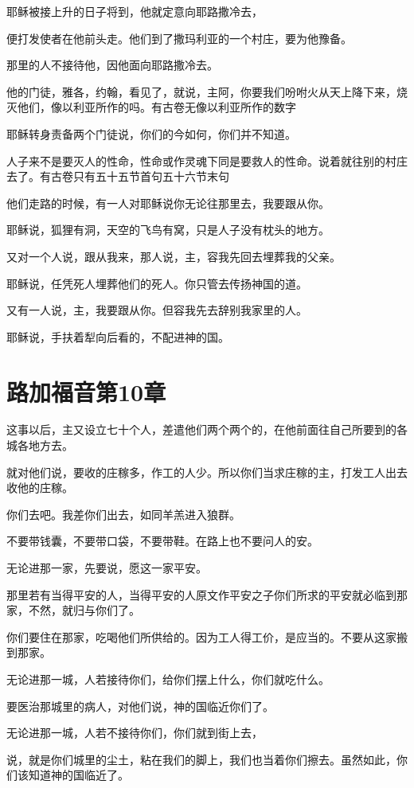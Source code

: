 \documentclass[12pt,oneside]{book}
\begin{document}
耶稣被接上升的日子将到，他就定意向耶路撒冷去，

便打发使者在他前头走。他们到了撒玛利亚的一个村庄，要为他豫备。

那里的人不接待他，因他面向耶路撒冷去。

他的门徒，雅各，约翰，看见了，就说，主阿，你要我们吩咐火从天上降下来，烧灭他们，像以利亚所作的吗。有古卷无像以利亚所作的数字

耶稣转身责备两个门徒说，你们的今如何，你们并不知道。

人子来不是要灭人的性命，性命或作灵魂下同是要救人的性命。说着就往别的村庄去了。有古卷只有五十五节首句五十六节末句

他们走路的时候，有一人对耶稣说你无论往那里去，我要跟从你。

耶稣说，狐狸有洞，天空的飞鸟有窝，只是人子没有枕头的地方。

又对一个人说，跟从我来，那人说，主，容我先回去埋葬我的父亲。

耶稣说，任凭死人埋葬他们的死人。你只管去传扬神国的道。

又有一人说，主，我要跟从你。但容我先去辞别我家里的人。

耶稣说，手扶着犁向后看的，不配进神的国。

\chapter{路加福音第10章}
这事以后，主又设立七十个人，差遣他们两个两个的，在他前面往自己所要到的各城各地方去。

就对他们说，要收的庄稼多，作工的人少。所以你们当求庄稼的主，打发工人出去收他的庄稼。

你们去吧。我差你们出去，如同羊羔进入狼群。

不要带钱囊，不要带口袋，不要带鞋。在路上也不要问人的安。

无论进那一家，先要说，愿这一家平安。

那里若有当得平安的人，当得平安的人原文作平安之子你们所求的平安就必临到那家，不然，就归与你们了。

你们要住在那家，吃喝他们所供给的。因为工人得工价，是应当的。不要从这家搬到那家。

无论进那一城，人若接待你们，给你们摆上什么，你们就吃什么。

要医治那城里的病人，对他们说，神的国临近你们了。

无论进那一城，人若不接待你们，你们就到街上去，

说，就是你们城里的尘土，粘在我们的脚上，我们也当着你们擦去。虽然如此，你们该知道神的国临近了。
\end{document}
